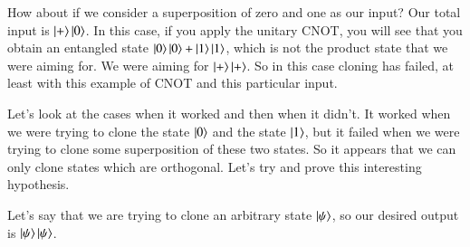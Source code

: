 How about if we consider a superposition of zero and one as our input? Our total input is $\left| + \right\rangle\left| 0 \right\rangle$. In this case, if you apply the unitary CNOT, you will see that you obtain an entangled state $\left| 0 \right\rangle\left| 0 \right\rangle+\left| 1 \right\rangle\left| 1 \right\rangle$, which is not the product state that we were aiming for. We were aiming for $\left| + \right\rangle\left| + \right\rangle$. So in this case cloning has failed, at least with this example of CNOT and this particular input.

Let's look at the cases when it worked and then when it didn't. It worked when we were trying to clone the state $\left| 0 \right\rangle$ and the state $\left| 1 \right\rangle$, but it failed when we were trying to clone some superposition of these two states. So it appears that we can only clone states which are orthogonal. Let's try and prove this interesting hypothesis.

Let's say that we are trying to clone an arbitrary state $\left| \psi \right\rangle$, so our desired output is $\left| \psi \right\rangle\left| \psi \right\rangle$.

